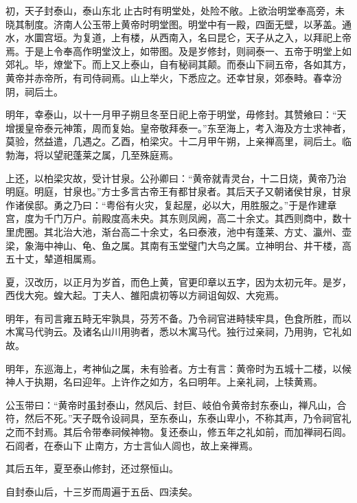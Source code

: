\documentclass[12pt,UTF8]{ctexbook}
\begin{document}
初，天子封泰山，泰山东北止古时有明堂处，处险不敞。上欲治明堂奉高旁，未晓其制度。济南人公玉带上黄帝时明堂图。明堂中有一殿，四面无壁，以茅盖。通水，水圜宫垣。为复道，上有楼，从西南入，名曰昆仑，天子从之入，以拜祀上帝焉。于是上令奉高作明堂汶上，如带图。及是岁修封，则祠泰一、五帝于明堂上如郊礼。毕，燎堂下。而上又上泰山，自有秘祠其颠。而泰山下祠五帝，各如其方，黄帝并赤帝所，有司侍祠焉。山上举火，下悉应之。还幸甘泉，郊泰畤。春幸汾阴，祠后土。



明年，幸泰山，以十一月甲子朔旦冬至日祀上帝于明堂，毋修封。其赞飨曰：“天增援皇帝泰元神策，周而复始。皇帝敬拜泰一。”东至海上，考入海及方士求神者，莫验，然益遣，几遇之。乙酉，柏梁灾。十二月甲午朔，上亲禅高里，祠后土。临勃海，将以望祀蓬莱之属，几至殊庭焉。



上还，以柏梁灾故，受计甘泉。公孙卿曰：“黄帝就青灵台，十二日烧，黄帝乃治明庭。明庭，甘泉也。”方士多言古帝王有都甘泉者。其后天子又朝诸侯甘泉，甘泉作诸侯邸。勇之乃曰：“粤俗有火灾，复起屋，必以大，用胜服之。”于是作建章宫，度为千门万户。前殿度高未央。其东则凤阙，高二十余丈。其西则商中，数十里虎圈。其北治大池，渐台高二十余丈，名曰泰液，池中有蓬莱、方丈、瀛州、壶梁，象海中神山、龟、鱼之属。其南有玉堂璧门大鸟之属。立神明台、井干楼，高五十丈，辇道相属焉。



夏，汉改历，以正月为岁首，而色上黄，官更印章以五字，因为太初元年。是岁，西伐大宛。蝗大起。丁夫人、雒阳虞初等以方祠诅匈奴、大宛焉。



明年，有司言雍五畤无牢孰具，芬芳不备。乃令祠官进畤犊牢具，色食所胜，而以木寓马代驹云。及诸名山川用驹者，悉以木寓马代。独行过亲祠，乃用驹，它礼如故。



明年，东巡海上，考神仙之属，未有验者。方士有言：黄帝时为五城十二楼，以候神人于执期，名曰迎年。上许作之如方，名曰明年。上亲礼祠，上犊黄焉。



公玉带曰：“黄帝时虽封泰山，然风后、封巨、岐伯令黄帝封东泰山，禅凡山，合符，然后不死。”天子既令设祠具，至东泰山，东泰山卑小，不称其声，乃令祠官礼之而不封焉。其后令带奉祠候神物。复还泰山，修五年之礼如前，而加禅祠石闾。石闾者，在泰山下止南方，方士言仙人闾也，故上亲禅焉。



其后五年，夏至泰山修封，还过祭恒山。



自封泰山后，十三岁而周遍于五岳、四渎矣。
\end{document}
